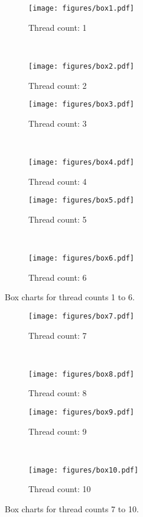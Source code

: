 \begin{figure}
	\centering
	\begin{subfigure}[t]{0.48\textwidth}
		\texttt{[image: figures/box1.pdf]}
		\caption{Thread count: 1}
	\end{subfigure}
	~
	\begin{subfigure}[t]{0.48\textwidth}
		\texttt{[image: figures/box2.pdf]}
		\caption{Thread count: 2}
	\end{subfigure}
	
	\begin{subfigure}[t]{0.48\textwidth}
		\texttt{[image: figures/box3.pdf]}
		\caption{Thread count: 3}
	\end{subfigure}
	~
	\begin{subfigure}[t]{0.48\textwidth}
		\texttt{[image: figures/box4.pdf]}
		\caption{Thread count: 4}
	\end{subfigure}
	
	\begin{subfigure}[t]{0.48\textwidth}
		\texttt{[image: figures/box5.pdf]}
		\caption{Thread count: 5}
	\end{subfigure}
	~
	\begin{subfigure}[t]{0.48\textwidth}
		\texttt{[image: figures/box6.pdf]}
		\caption{Thread count: 6}
	\end{subfigure}

	\caption{Box charts for thread counts 1 to 6.}
	\label{box1}
\end{figure}

\begin{figure}
	\centering
	\begin{subfigure}[t]{0.48\textwidth}
		\texttt{[image: figures/box7.pdf]}
		\caption{Thread count: 7}
	\end{subfigure}
	~
	\begin{subfigure}[t]{0.48\textwidth}
		\texttt{[image: figures/box8.pdf]}
		\caption{Thread count: 8}
	\end{subfigure}

	\begin{subfigure}[t]{0.48\textwidth}
		\texttt{[image: figures/box9.pdf]}
		\caption{Thread count: 9}
	\end{subfigure}
	~
	\begin{subfigure}[t]{0.48\textwidth}
		\texttt{[image: figures/box10.pdf]}
		\caption{Thread count: 10}
	\end{subfigure}

	\caption{Box charts for thread counts 7 to 10.}
	\label{box2}
\end{figure}
